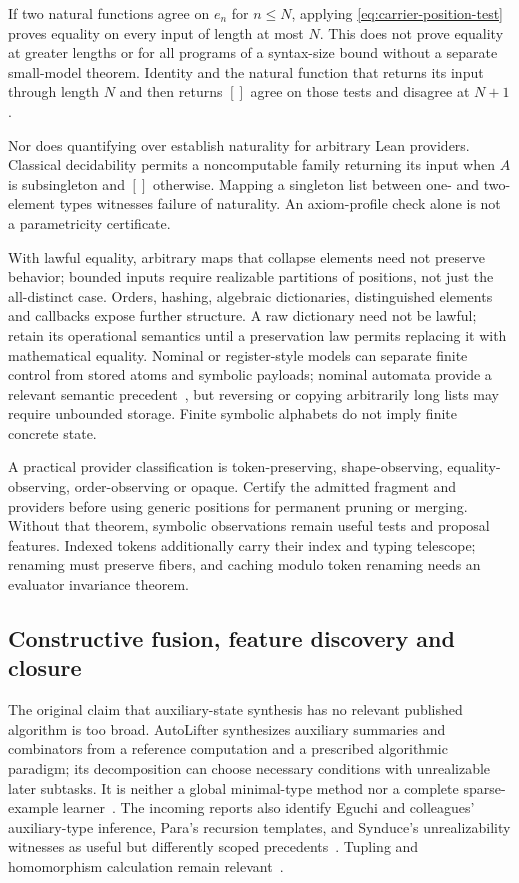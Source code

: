 If two natural functions agree on $e_n$ for $n\le N$, applying
\eqref{eq:carrier-position-test} proves equality on every input of length at
most $N$. This does not prove equality at greater lengths or for all programs
of a syntax-size bound without a separate small-model theorem. Identity and
the natural function that returns its input through length $N$ and then
returns $[]$ agree on those tests and disagree at $N+1$.

Nor does quantifying over  establish naturality for arbitrary Lean
providers. Classical decidability permits a noncomputable family returning
its input when $A$ is subsingleton and $[]$ otherwise. Mapping a singleton
list between one- and two-element types witnesses failure of naturality.
An axiom-profile check alone is not a parametricity certificate.

With lawful equality, arbitrary maps that collapse elements need not preserve
behavior; bounded inputs require realizable partitions of positions, not just
the all-distinct case. Orders, hashing, algebraic dictionaries, distinguished
elements and callbacks expose further structure. A raw  dictionary
need not be lawful; retain its operational semantics until a preservation law
permits replacing it with mathematical equality. Nominal or register-style
models can separate finite control from stored atoms and symbolic payloads;
nominal automata provide a relevant semantic precedent~\cite{nominal},
but reversing or copying arbitrarily long lists may require unbounded storage.
Finite symbolic alphabets do not imply finite concrete state.

A practical provider classification is token-preserving, shape-observing,
equality-observing, order-observing or opaque. Certify the admitted fragment
and providers before using generic positions for permanent pruning or merging.
Without that theorem, symbolic observations remain useful tests and proposal
features. Indexed tokens additionally carry their index and typing telescope;
renaming must preserve fibers, and caching modulo token renaming needs an
evaluator invariance theorem.

\subsection{Constructive fusion, feature discovery and closure}
\label{sec:carrier-lifting}

The original claim that auxiliary-state synthesis has no relevant published
algorithm is too broad. AutoLifter synthesizes auxiliary summaries and
combinators from a reference computation and a prescribed algorithmic paradigm;
its decomposition can choose necessary conditions with unrealizable later
subtasks. It is neither a global minimal-type method nor a complete sparse-
example learner~\cite{autolifter}. The incoming reports also identify Eguchi and colleagues'
auxiliary-type inference, Para's recursion templates, and Synduce's
unrealizability witnesses as useful but differently scoped precedents~\cite{eguchi,para,synduce}.
Tupling and homomorphism calculation remain relevant~\cite{tupling,thirdhom}.

